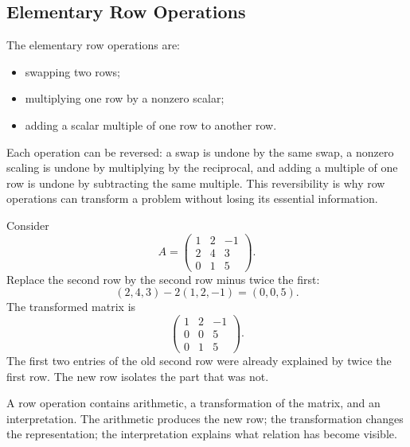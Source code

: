 \subsection{Elementary Row Operations}

\begin{definitionbox}
The elementary row operations are:
\begin{itemize}
    \item swapping two rows;
    \item multiplying one row by a nonzero scalar;
    \item adding a scalar multiple of one row to another row.
\end{itemize}
\end{definitionbox}

\begin{interpretationbox}
Each operation can be reversed: a swap is undone by the same swap, a nonzero
scaling is undone by multiplying by the reciprocal, and adding a multiple of one
row is undone by subtracting the same multiple. This reversibility is why row
operations can transform a problem without losing its essential information.
\end{interpretationbox}

\begin{examplebox}
Consider
\[
A=
\begin{pmatrix}
1&2&-1\\
2&4&3\\
0&1&5
\end{pmatrix}.
\]
Replace the second row by the second row minus twice the first:
\[
(2,4,3)-2(1,2,-1)=(0,0,5).
\]
The transformed matrix is
\[
\begin{pmatrix}
1&2&-1\\
0&0&5\\
0&1&5
\end{pmatrix}.
\]
The first two entries of the old second row were already explained by twice the
first row. The new row isolates the part that was not.
\end{examplebox}

\begin{interpretationbox}
A row operation contains arithmetic, a transformation of the matrix, and an
interpretation. The arithmetic produces the new row; the transformation changes
the representation; the interpretation explains what relation has become
visible.
\end{interpretationbox}
